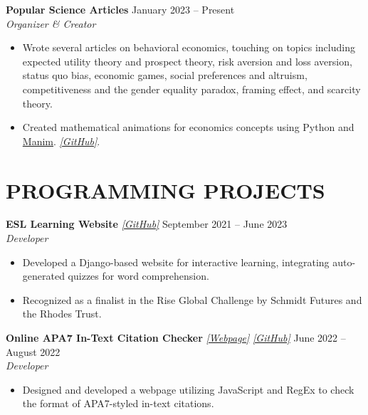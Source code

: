 \documentclass[letterpaper, 9pt]{extarticle}
\begin{document}
\noindent
\textbf{Popular Science Articles} 
\hfill January 2023 -- Present \\
\textit{Organizer \& Creator}
\begin{itemize}
    \item Wrote several articles on behavioral economics, touching on topics including expected utility theory and prospect theory, risk aversion and loss aversion, status quo bias, economic games, social preferences and altruism, competitiveness and the gender equality paradox, framing effect, and scarcity theory. 
    \item Created mathematical animations for economics concepts using Python and \href{https://www.manim.community/}{Manim}. \emph{\href{https://github.com/AdenChen27/Econic}{\color{blue} [GitHub]}}.
\end{itemize}

\section*{PROGRAMMING PROJECTS}

\noindent
\textbf{ESL Learning Website} 
\emph{\href{https://github.com/AdenChen27/Project_0}{\color{blue} [GitHub]}}
\hfill September 2021 -- June 2023  \\
\textit{Developer}
\begin{itemize}
    \item Developed a Django-based website for interactive learning, integrating auto-generated quizzes for word comprehension. 
    \item Recognized as a finalist in the Rise Global Challenge by Schmidt Futures and the Rhodes Trust.
\end{itemize}

\noindent
\textbf{Online APA7 In-Text Citation Checker} \emph{\href{https://adenchen27.github.io/citation_checker/main.html}{\color{blue} [Webpage]}}
\emph{\href{https://github.com/AdenChen27/AdenChen27.github.io/tree/main/citation_checker}{\color{blue} [GitHub]}}
\hfill June 2022 -- August 2022 \\
\textit{Developer} 
\begin{itemize}
    \item Designed and developed a webpage utilizing JavaScript and RegEx to check the format of APA7-styled in-text citations.
\end{itemize}
\end{document}

